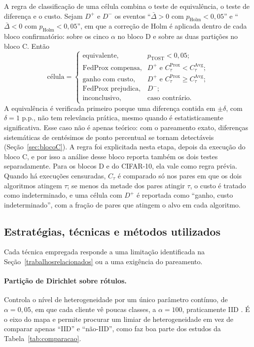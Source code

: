 A regra de classificação de uma célula combina o teste de equivalência, o teste de diferença e o custo. Sejam $D^{+}$ e $D^{-}$ os eventos ``$\bar\Delta > 0$ com $p_{\text{Holm}} < 0{,}05$'' e ``$\bar\Delta < 0$ com $p_{\text{Holm}} < 0{,}05$'', em que a correção de Holm é aplicada dentro de cada bloco confirmatório: sobre os cinco $\alpha$ no bloco D e sobre as duas partições no bloco C. Então
\begin{equation}
    \text{célula} =
    \begin{cases}
        \text{equivalente}, & p_{\text{TOST}} < 0{,}05;\\
        \text{FedProx compensa}, & D^{+} \text{ e } C_\tau^{\text{Prox}} < C_\tau^{\text{Avg}};\\
        \text{ganho com custo}, & D^{+} \text{ e } C_\tau^{\text{Prox}} \geq C_\tau^{\text{Avg}};\\
        \text{FedProx prejudica}, & D^{-};\\
        \text{inconclusivo}, & \text{caso contrário.}
    \end{cases}
    \label{eq:mapa}
\end{equation}
A equivalência é verificada primeiro porque uma diferença contida em $\pm\delta$, com $\delta = 1$ p.p., não tem relevância prática, mesmo quando é estatisticamente significativa. Esse caso não é apenas teórico: com o pareamento exato, diferenças sistemáticas de centésimos de ponto percentual se tornam detectáveis (Seção~\ref{sec:blocoC}). A regra foi explicitada nesta etapa, depois da execução do bloco C, e por isso a análise desse bloco reporta também os dois testes separadamente. Para os blocos D e do CIFAR-10, ela vale como regra prévia. Quando há execuções censuradas, $C_\tau$ é comparado só nos pares em que os dois algoritmos atingem $\tau$; se menos da metade dos pares atingir $\tau$, o custo é tratado como indeterminado, e uma célula com $D^{+}$ é reportada como ``ganho, custo indeterminado'', com a fração de pares que atingem o alvo em cada algoritmo.

\subsection{Estratégias, técnicas e métodos utilizados}
\label{sec:tecnicas}

Cada técnica empregada responde a uma limitação identificada na Seção~\ref{trabalhosrelacionados} ou a uma exigência do pareamento.

\paragraph{Partição de Dirichlet sobre rótulos.} Controla o nível de heterogeneidade por um único parâmetro contínuo, de $\alpha = 0{,}05$, em que cada cliente vê poucas classes, a $\alpha = 100$, praticamente IID \citep{hsu2019fedavgm}. É o eixo do mapa e permite procurar um limiar de heterogeneidade em vez de comparar apenas ``IID'' e ``não-IID'', como faz boa parte dos estudos da Tabela~\ref{tab:comparacao}.

